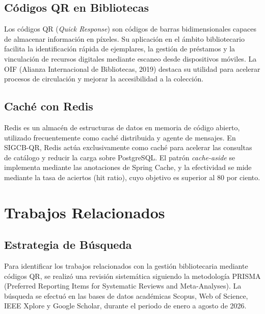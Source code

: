 \documentclass[
11pt,
a4paper,
]{report}
\begin{document}
	\hypertarget{codigos-qr}{%
		\section{Códigos QR en Bibliotecas}\label{codigos-qr}}
	
	Los códigos QR (\emph{Quick Response}) son códigos de barras bidimensionales capaces de almacenar información en píxeles. Su aplicación en el ámbito bibliotecario facilita la identificación rápida de ejemplares, la gestión de préstamos y la vinculación de recursos digitales mediante escaneo desde dispositivos móviles. La OIF (Alianza Internacional de Bibliotecas, 2019) destaca su utilidad para acelerar procesos de circulación y mejorar la accesibilidad a la colección.
	
	\hypertarget{cache-redis}{%
		\section{Caché con Redis}\label{cache-redis}}
	
	Redis es un almacén de estructuras de datos en memoria de código abierto, utilizado frecuentemente como caché distribuida y agente de mensajes. En SIGCB-QR, Redis actúa exclusivamente como caché para acelerar las consultas de catálogo y reducir la carga sobre PostgreSQL. El patrón \emph{cache-aside} se implementa mediante las anotaciones de Spring Cache, y la efectividad se mide mediante la tasa de aciertos (hit ratio), cuyo objetivo es superior al 80 por ciento.
	
	\hypertarget{trabajos-relacionados}{%
		\chapter{Trabajos Relacionados}\label{trabajos-relacionados}}
	
	\hypertarget{estrategia-de-busqueda}{%
		\section{Estrategia de Búsqueda}\label{estrategia-de-busqueda}}
	
	Para identificar los trabajos relacionados con la gestión bibliotecaria mediante códigos QR, se realizó una revisión sistemática siguiendo la metodología PRISMA (Preferred Reporting Items for Systematic Reviews and Meta-Analyses). La búsqueda se efectuó en las bases de datos académicas Scopus, Web of Science, IEEE Xplore y Google Scholar, durante el periodo de enero a agosto de 2026.
	
\end{document}
